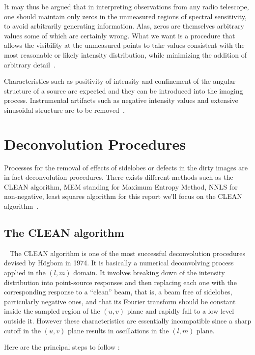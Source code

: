 It may thus be argued that in interpreting observations from any radio telescope, one should maintain only zeros in the unmeasured regions of spectral sensitivity, to avoid arbitrarily generating information. Alas, zeros are themselves arbitrary values some of which are certainly wrong. What we want is a procedure that allows the visibility at the unmeasured points to take values consistent with the most reasonable or likely intensity distribution, while minimizing the addition of arbitrary detail~\citep[Pg.~427]{thompson2008interferometry}.

Characteristics such as positivity of intensity and confinement of the angular structure of a source are expected and they can be introduced into the imaging process. Instrumental artifacts such as negative intensity values and extensive sinusoidal structure are to be removed~\citep[Pg.~427]{thompson2008interferometry}.
\section{Deconvolution Procedures}
\label{sec:deconvTech}
Processes for the removal of effects of sidelobes or defects in the dirty images are in fact deconvolution procedures.
There exists different methods such as the CLEAN algorithm, MEM standing for Maximum Entropy Method, NNLS for non-negative, least squares algorithm for this report we'll focus on the CLEAN algorithm{~\citep[for~the~others~see][Sec.~10.3]{thompson2008interferometry}}.
\subsection{The CLEAN algorithm}
\label{sec:cleanAlgo}
~\citep[From Pgs.~427-429]{thompson2008interferometry}
The CLEAN algorithm is one of the most successful deconvolution procedures devised by Högbom in 1974. It is basically a numerical deconvolving process applied in the $(l,m)$ domain. It involves breaking down of the intensity distribution into point-source responses and then replacing each one with the corresponding response to a “clean” beam, that is, a beam free of sidelobes, particularly negative ones, and that its Fourier transform should be constant inside the sampled region of the $(u ,v)$ plane and rapidly fall to a low level outside it. However these characteristics are essentially incompatible since a sharp cutoff in the $(u, v)$ plane results in oscillations in the $(l,m)$ plane.

Here are the principal steps to follow :

